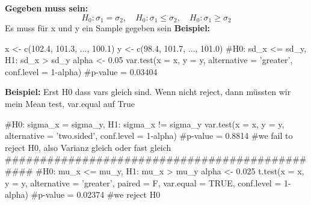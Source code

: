 \large{\textbf{Gegeben muss sein:}}
\[
H_0: \sigma_1 = \sigma_2, \quad 
H_0: \sigma_1 \leq \sigma_2, \quad 
H_0: \sigma_1 \geq \sigma_2
\]
\textcolor{red}{\warning} Es muss für x und y ein Sample gegeben sein \textcolor{red}{\warning}
\large{\textbf{Beispiel:}}
\begin{rcode}{1}
x <- c(102.4, 101.3, ..., 100.1)
y <- c(98.4, 101.7, ..., 101.0)
#H0: sd_x <= sd_y, H1: sd_x > sd_y
alpha <- 0.05
var.test(x = x, y = y, alternative = 'greater', conf.level = 1-alpha)
#p-value = 0.03404
\end{rcode}

\large{\textbf{Beispiel:}}
\normalsize
Erst H0 dass vars gleich sind. Wenn nicht reject, dann müssten wir mein Mean test, var.equal auf True
\begin{rcode}{1}
#H0: sigma_x = sigma_y, H1: sigma_x != sigma_y
var.test(x = x, y = y, alternative = 'two.sided', conf.level = 1-alpha)
#p-value = 0.8814
#we fail to reject H0, also Varianz gleich oder fast gleich
###############################################
#H0: mu_x <= mu_y, H1: mu_x > mu_y
alpha <- 0.025
t.test(x = x, y = y, alternative = 'greater', paired = F, var.equal = TRUE, conf.level = 1-alpha)
#p-value = 0.02374
#we reject H0
\end{rcode}
